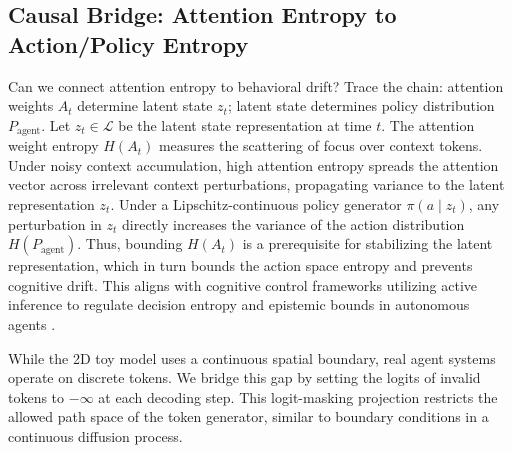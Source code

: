 \documentclass[10pt,journal,compsoc]{IEEEtran}
\begin{document}
\subsection{Causal Bridge: Attention Entropy to Action/Policy Entropy}
Can we connect attention entropy to behavioral drift? Trace the chain: attention weights $A_t$ determine latent state $z_t$; latent state determines policy distribution $P_{\text{agent}}$. Let $z_t \in \mathcal{L}$ be the latent state representation at time $t$. The attention weight entropy $H(A_t)$ measures the scattering of focus over context tokens. Under noisy context accumulation, high attention entropy spreads the attention vector across irrelevant context perturbations, propagating variance to the latent representation $z_t$. Under a Lipschitz-continuous policy generator $\pi(a \mid z_t)$, any perturbation in $z_t$ directly increases the variance of the action distribution $H(P_{\text{agent}})$. Thus, bounding $H(A_t)$ is a prerequisite for stabilizing the latent representation, which in turn bounds the action space entropy and prevents cognitive drift. This aligns with cognitive control frameworks utilizing active inference to regulate decision entropy \cite{wang2024tcds} and epistemic bounds in autonomous agents \cite{zhang2025tcds, smith2023tcds}.

While the 2D toy model uses a continuous spatial boundary, real agent systems operate on discrete tokens. We bridge this gap by setting the logits of invalid tokens to $-\infty$ at each decoding step. This logit-masking projection restricts the allowed path space of the token generator, similar to boundary conditions in a continuous diffusion process.
\end{document}
